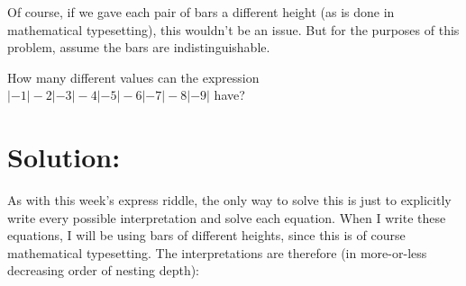 \documentclass{article}
\begin{document}
Of course, if we gave each pair of bars a different height (as is done in mathematical typesetting), this wouldn't be an issue.
But for the purposes of this problem, assume the bars are indistinguishable.

How many different values can the expression $|-1|-2|-3|-4|-5|-6|-7|-8|-9|$ have?

\section*{Solution:}

As with this week's express riddle, the only way to solve this is just to explicitly write every possible interpretation and solve each equation.
When I write these equations, I will be using bars of different heights, since this is of course mathematical typesetting.
The interpretations are therefore (in more-or-less decreasing order of nesting depth):
\end{document}
